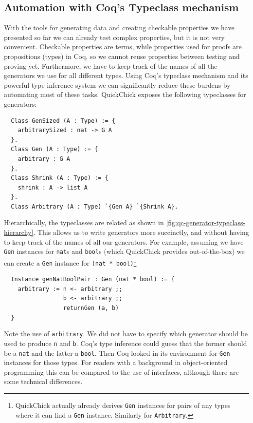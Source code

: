 \documentclass[twoside,11pt,openright]{report}
\newenvironment{code}{\captionsetup{type=figure, singlelinecheck=off, justification=raggedleft}}{}
\newcommand{\coq}[1]{\texttt{#1}}
\begin{document}
\subsection{Automation with Coq's Typeclass mechanism}
With the tools for generating data and creating checkable properties we have presented so far we can already test complex properties, but it is not very convenient. Checkable properties are terms, while properties used for proofs are propositions (types) in Coq, so we cannot reuse properties between testing and proving yet. Furthermore, we have to keep track of the names of all the generators we use for all different types. Using Coq's typeclass mechanism and its powerful type inference system we can significantly reduce these burdens by automating most of these tasks. QuickChick exposes the following typeclasses for generators:
\begin{code}
\label{def:GenSized-Gen-Shrink}
\begin{verbatim}
  Class GenSized (A : Type) := { 
    arbitrarySized : nat -> G A 
  }.
  Class Gen (A : Type) := { 
    arbitrary : G A
  }.
  Class Shrink (A : Type) := {
    shrink : A -> list A
  }.
  Class Arbitrary (A : Type) `{Gen A} `{Shrink A}.
\end{verbatim}
\end{code}
Hierarchically, the typeclasses are related as shown in \autoref{fig:qc-generator-typeclass-hierarchy}. This allows us to write generators more succinctly, and without having to keep track of the names of all our generators. For example, assuming we have \coq{Gen} instances for \coq{nat}s and \coq{bool}s (which QuickChick provides out-of-the-box) we can create a \coq{Gen} instance for \coq{(nat * bool)}\footnote{QuickChick actually already derives \coq{Gen} instances for pairs of any types where it can find a \coq{Gen} instance. Similarly for \coq{Arbitrary}.}  
\begin{code}
\label{def:genNatBoolPair}
\begin{verbatim}
  Instance genNatBoolPair : Gen (nat * bool) := {
    arbitrary := n <- arbitrary ;;
                 b <- arbitrary ;;
                 returnGen (a, b)
  } 
\end{verbatim}
\end{code}
Note the use of \coq{arbitrary}. We did not have to specify which generator should be used to produce \coq{n} and \coq{b}. Coq's type inference could guess that the former should be a \coq{nat} and the latter a \coq{bool}. Then Coq looked in its environment for \coq{Gen} instances for those types. For readers with a background in object-oriented programming this can be compared to the use of interfaces, although there are some technical differences.
\end{document}
